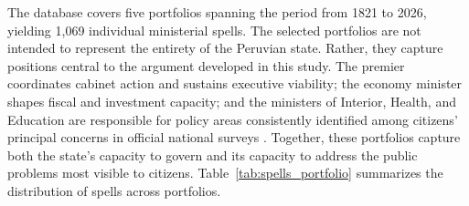 \documentclass[doc, 12pt, a4paper,floatsintext]{apa7}
\begin{document}
The database covers five portfolios spanning the period from 1821 to 2026, 
yielding 1,069 individual ministerial spells. The selected portfolios are 
not intended to represent the entirety of the Peruvian state. Rather, they 
capture positions central to the argument developed in this study. The 
premier coordinates cabinet action and sustains executive viability; the 
economy minister shapes fiscal and investment capacity; and the ministers 
of Interior, Health, and Education are responsible for policy areas 
consistently identified among citizens' principal concerns in official 
national surveys \parencite{inei_encuesta_2024}. Together, these portfolios 
capture both the state's capacity to govern and its capacity to address the 
public problems most visible to citizens. Table~\ref{tab:spells_portfolio} 
summarizes the distribution of spells across portfolios.





\begin{table}[!h]
\centering
\caption{\label{tab:spells_portfolio}Ministerial Spells by Portfolio}
\centering
{}
\end{table}
\end{document}
